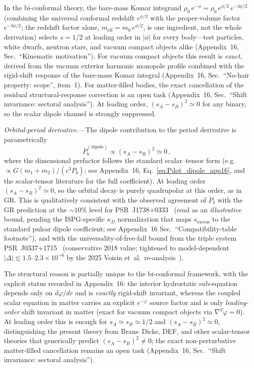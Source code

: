 \documentclass[aps,prd,onecolumn,superscriptaddress,nofootinbib,showpacs,12pt]{revtex4-2}
\begin{document}
In the bi-conformal theory, the bare-mass Komar
integrand $\rho_0\,e^{-\phi}
= \rho_0\,e^{\phi/2}\,e^{-3\phi/2}$ (combining the
universal conformal redshift $e^{\phi/2}$ with the
proper-volume factor $e^{-3\phi/2}$; the redshift factor
alone, $m_{\mathrm{eff}} = m_0\,e^{\phi/2}$, is one
ingredient, not the whole derivation) selects
$s = 1/2$ at leading order in $|\phi|$ for every
body---test particles, white dwarfs, neutron stars, and
vacuum compact objects alike (Appendix~16,
Sec.~``Kinematic motivation'').  For vacuum compact
objects this result is \emph{exact}, derived from the
vacuum exterior harmonic monopole profile combined with the
rigid-shift response of the bare-mass Komar integral
(Appendix~16, Sec.~``No-hair property: scope'',
item~1).  For matter-filled bodies, the
exact cancellation of the residual structural-response
correction is an open task (Appendix~16, Sec.~``Shift
invariance: sectoral analysis'').  At leading order,
$(s_{A} - s_{B})^{2} \simeq 0$ for any binary, so the
scalar dipole channel is strongly suppressed.

\textit{Orbital-period derivative.}---The dipole
contribution to the period derivative is parametrically
\begin{equation}\label{eq:Pdot_dipole}
  \dot{P}_{b}^{(\mathrm{dipole})} \propto
  (s_{A} - s_{B})^{2} \simeq 0\,,
\end{equation}
where the dimensional prefactor follows the standard
scalar--tensor form (e.g.\ $\propto G(m_{1}+m_{2})/(c^{3}P_{b})$;
see Appendix~16, Eq.~\ref{eq:Pdot_dipole_app16}, and the
scalar-tensor literature for the full coefficient).  At
leading order $(s_{A}-s_{B})^{2}\simeq 0$, so the orbital
decay is purely quadrupolar at this order, as in GR.  This is qualitatively
consistent with the observed agreement of $\dot{P}_{b}$ with the GR
prediction at the $\sim 10\%$ level for
PSR~J1738+0333~\cite{Freire2012} (read as an
\emph{illustrative} bound, pending the ISPG-specific
$\kappa_D$ normalization that maps
$s_{\mathrm{excess}}$ to the standard pulsar dipole
coefficient; see Appendix~16
Sec.~``Compatibility-table footnote''), and with the
universality-of-free-fall bound from the triple system
PSR~J0337+1715~\cite{Archibald2018} (conservative 2018
value; tightened to model-dependent
$|\Delta|\lesssim 1.5$--$2.3\times10^{-6}$ by the 2025
Voisin et~al.\ re-analysis~\cite{Voisin2025}).

The structural reason is partially unique to the
bi-conformal framework, with the explicit status
recorded in Appendix~16: the interior hydrostatic
sub-equation depends only on $d\varphi/dr$ and is
\emph{exactly} rigid-shift invariant, whereas the
coupled scalar equation in matter carries an explicit
$e^{-\varphi}$ source factor and is only
\emph{leading-order} shift invariant in matter (exact
for vacuum compact objects via $\nabla^{2}\varphi=0$).
At leading order this is enough for $s_{A}\simeq s_{B}
\simeq 1/2$ and $(s_{A}-s_{B})^{2}\simeq 0$, distinguishing
the present theory from Brans--Dicke, DEF, and other
scalar-tensor theories that generically predict
$(s_{A}-s_{B})^{2}\neq 0$; the exact non-perturbative
matter-filled cancellation remains an open task
(Appendix~16, Sec.~``Shift invariance: sectoral
analysis'').
\end{document}
